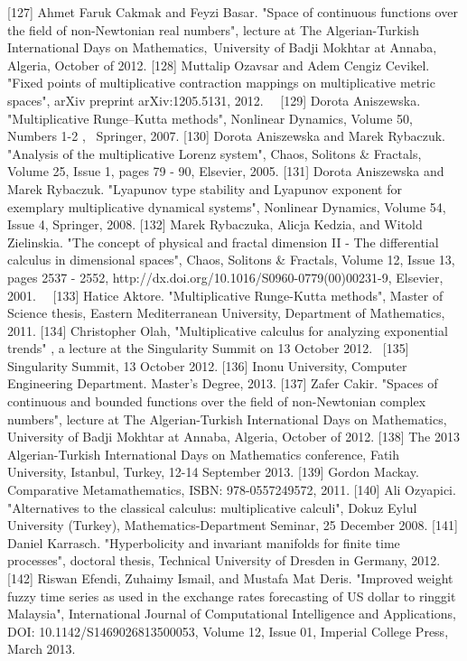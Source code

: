 \documentclass[12pt]{article}
\begin{document}
[127] Ahmet Faruk Cakmak and Feyzi Basar. "Space of continuous functions over the field of non-Newtonian real numbers", lecture at The Algerian-Turkish International Days on Mathematics, University of Badji Mokhtar at Annaba, Algeria, October of 2012.
[128] Muttalip Ozavsar and Adem Cengiz Cevikel. "Fixed points of multiplicative contraction mappings on multiplicative metric spaces", arXiv preprint arXiv:1205.5131, 2012.   
[129] Dorota Aniszewska. "Multiplicative Runge–Kutta methods", Nonlinear Dynamics, Volume 50, Numbers 1-2 ,  Springer, 2007.
[130] Dorota Aniszewska and Marek Rybaczuk. "Analysis of the multiplicative Lorenz system", Chaos, Solitons & Fractals, Volume 25, Issue 1, pages 79 - 90, Elsevier, 2005.
[131] Dorota Aniszewska and Marek Rybaczuk. "Lyapunov type stability and Lyapunov exponent for exemplary multiplicative dynamical systems", Nonlinear Dynamics, Volume 54, Issue 4, Springer, 2008.
[132] Marek Rybaczuka, Alicja Kedzia, and Witold Zielinskia. "The concept of physical and fractal dimension II - The differential calculus in dimensional spaces", Chaos, Solitons & Fractals, Volume 12, Issue 13, pages 2537 - 2552, http://dx.doi.org/10.1016/S0960-0779(00)00231-9, Elsevier, 2001.  
[133] Hatice Aktore. "Multiplicative Runge-Kutta methods", Master of Science thesis, Eastern Mediterranean University, Department of Mathematics, 2011.
[134] Christopher Olah, "Multiplicative calculus for analyzing exponential trends" , a lecture at the Singularity Summit on 13 October 2012.  
[135] Singularity Summit, 13 October 2012.
[136] Inonu University, Computer Engineering Department. Master's Degree, 2013.
[137] Zafer Cakir. "Spaces of continuous and bounded functions over the field of non-Newtonian complex numbers", lecture at The Algerian-Turkish International Days on Mathematics, University of Badji Mokhtar at Annaba, Algeria, October of 2012.
[138] The 2013 Algerian-Turkish International Days on Mathematics conference, Fatih University, Istanbul, Turkey, 12-14 September 2013.
[139] Gordon Mackay. Comparative Metamathematics, ISBN: 978-0557249572, 2011.
[140] Ali Ozyapici. "Alternatives to the classical calculus: multiplicative calculi", Dokuz Eylul University (Turkey), Mathematics-Department Seminar, 25 December 2008.
[141] Daniel Karrasch. "Hyperbolicity and invariant manifolds for finite time processes", doctoral thesis, Technical University of Dresden in Germany, 2012.
[142] Riswan Efendi, Zuhaimy Ismail, and Mustafa Mat Deris. "Improved weight fuzzy time series as used in the exchange rates forecasting of US dollar to ringgit Malaysia", International Journal of Computational Intelligence and Applications, DOI: 10.1142/S1469026813500053, Volume 12, Issue 01, Imperial College Press, March 2013.
\end{document}
